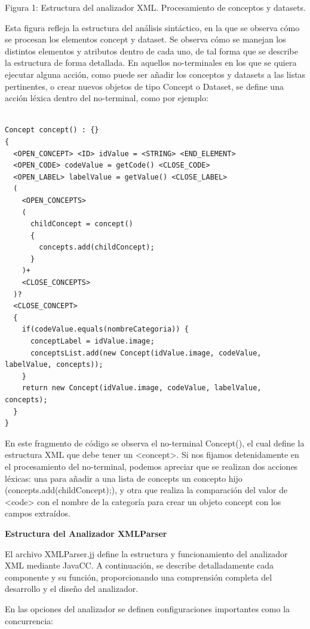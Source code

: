 Figura 1: Estructura del analizador XML. Procesamiento de conceptos y datasets.

Esta figura refleja la estructura del análisis sintáctico, en la que se observa cómo se procesan los elementos concept y dataset. Se observa cómo se manejan los distintos elementos y atributos dentro de cada uno, de tal forma que se describe la estructura de forma detallada. En aquellos no-terminales en los que se quiera ejecutar alguna acción, como puede ser añadir los conceptos y datasets a las listas pertinentes, o crear nuevos objetos de tipo Concept o Dataset, se define una acción léxica dentro del no-terminal, como por ejemplo:

\begin{lstlisting}

Concept concept() : {}
{
  <OPEN_CONCEPT> <ID> idValue = <STRING> <END_ELEMENT>
  <OPEN_CODE> codeValue = getCode() <CLOSE_CODE>
  <OPEN_LABEL> labelValue = getValue() <CLOSE_LABEL>
  (
    <OPEN_CONCEPTS>
    (
      childConcept = concept()
      {
        concepts.add(childConcept);
      }
    )+
    <CLOSE_CONCEPTS>
  )?
  <CLOSE_CONCEPT>
  {
    if(codeValue.equals(nombreCategoria)) {
      conceptLabel = idValue.image;
      conceptsList.add(new Concept(idValue.image, codeValue, labelValue, concepts));
    }
    return new Concept(idValue.image, codeValue, labelValue, concepts);
  }
}

\end{lstlisting}

En este fragmento de código se observa el no-terminal Concept(), el cual define la estructura XML que debe tener un <concept>. Si nos fijamos detenidamente en el procesamiento del no-terminal, podemos apreciar que se realizan dos acciones léxicas: una para añadir a una lista de concepts un concepto hijo (concepts.add(childConcept);), y otra que realiza la comparación del valor de <code> con el nombre de la categoría para crear un objeto concept con los campos extraídos.

\phantom{text}

\noindent \textbf{Estructura del Analizador XMLParser}

\phantom{text}

\noindent El archivo XMLParser.jj define la estructura y funcionamiento del analizador XML mediante JavaCC. A continuación, se describe detalladamente cada componente y su función, proporcionando una comprensión completa del desarrollo y el diseño del analizador.

En las opciones del analizador se definen configuraciones importantes como la concurrencia:

